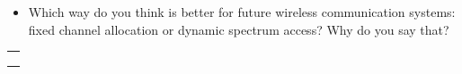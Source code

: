\documentclass[11pt]{article}
\providecommand{\tightlist}{%
      \setlength{\itemsep}{0pt}\setlength{\parskip}{0pt}}
\begin{document}
\begin{itemize}
\tightlist
\item
  Which way do you think is better for future wireless communication
  systems: fixed channel allocation or dynamic spectrum access? Why do
  you say that?
\end{itemize}

\begin{longtable}[]{@{}l@{}}
\toprule
 \\
\midrule
\endhead
 \\
 \\
 \\
\bottomrule
\end{longtable}


    
    
    
\end{document}
